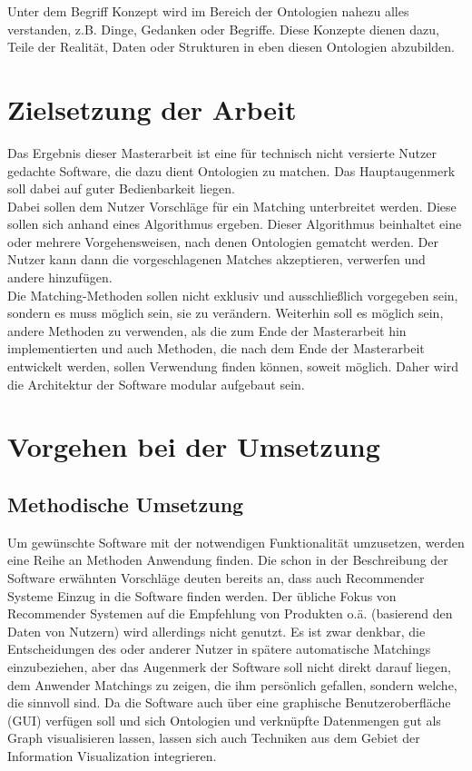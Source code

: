 Unter dem Begriff Konzept wird im Bereich der Ontologien nahezu alles verstanden, z.B. Dinge, Gedanken oder Begriffe. \cite{Usc95}  Diese Konzepte dienen dazu, Teile der Realität, Daten oder Strukturen in eben diesen Ontologien abzubilden.

\section{Zielsetzung der Arbeit}
Das Ergebnis dieser Masterarbeit ist eine für technisch nicht versierte Nutzer
gedachte Software, die dazu dient Ontologien zu matchen. Das Hauptaugenmerk soll dabei auf guter Bedienbarkeit liegen.\\
Dabei sollen dem Nutzer Vorschläge für ein Matching unterbreitet werden. Diese
sollen sich anhand eines Algorithmus ergeben. Dieser Algorithmus beinhaltet eine oder mehrere Vorgehensweisen, nach denen Ontologien gematcht werden. Der Nutzer kann dann die vorgeschlagenen Matches akzeptieren, verwerfen und andere hinzufügen.\\
Die Matching-Methoden sollen nicht exklusiv und ausschließlich vorgegeben sein, sondern es muss möglich sein, sie zu verändern. Weiterhin soll es möglich sein, andere Methoden zu verwenden, als die zum Ende der Masterarbeit hin implementierten und auch Methoden, die nach dem Ende der Masterarbeit entwickelt werden, sollen Verwendung finden können, soweit möglich. Daher wird die Architektur der Software modular aufgebaut sein.

\section{Vorgehen bei der Umsetzung}

\subsection{Methodische Umsetzung}
Um gewünschte Software mit der notwendigen Funktionalität umzusetzen, werden eine Reihe an Methoden Anwendung finden. Die schon in der Beschreibung der Software erwähnten Vorschläge deuten bereits an, dass auch Recommender Systeme Einzug in die Software finden werden. Der übliche Fokus von Recommender Systemen auf die Empfehlung von Produkten o.ä. (basierend den Daten von Nutzern) wird allerdings nicht genutzt. Es ist zwar denkbar, die Entscheidungen des oder anderer Nutzer in spätere automatische Matchings einzubeziehen, aber das Augenmerk der Software soll nicht direkt darauf liegen, dem Anwender Matchings zu zeigen, die ihm persönlich gefallen, sondern welche, die sinnvoll sind. Da die Software auch über eine graphische Benutzeroberfläche (GUI) verfügen soll und sich Ontologien und verknüpfte Datenmengen gut als Graph visualisieren lassen, lassen sich auch Techniken aus dem Gebiet der Information Visualization integrieren.

